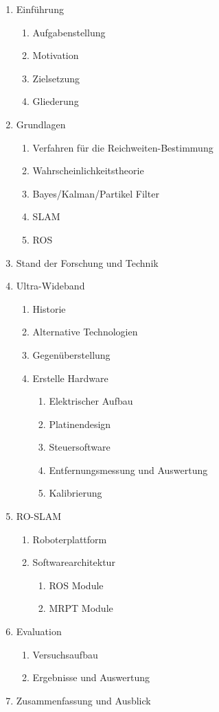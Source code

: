 \documentclass[12pt]{article}
\begin{document}
\begin{enumerate}
	\item Einführung
	\begin{enumerate}
		\item Aufgabenstellung			%
		\item Motivation					%
		\item Zielsetzung					%
		\item Gliederung					%
	\end{enumerate}
	\item Grundlagen						%
	\begin{enumerate}
		\item Verfahren für die Reichweiten-Bestimmung
		\item Wahrscheinlichkeitstheorie
		\item Bayes/Kalman/Partikel Filter
		\item SLAM
		\item ROS								%
	\end{enumerate}
	\item Stand der Forschung und Technik
	\item Ultra-Wideband
	\begin{enumerate}
		\item Historie
		\item Alternative Technologien
		\item Gegenüberstellung
		\item Erstelle Hardware
		\begin{enumerate}
			\item Elektrischer Aufbau
			\item Platinendesign
			\item Steuersoftware
			\item Entfernungsmessung und Auswertung		%
			\item Kalibrierung
		\end{enumerate}
	\end{enumerate}
	\item RO-SLAM
	\begin{enumerate}
		\item Roboterplattform				%
		\item Softwarearchitektur		%
		\begin{enumerate}	
			\item ROS Module
			\item MRPT Module
		\end{enumerate}
	\end{enumerate}
	\item Evaluation
	\begin{enumerate}
		\item Versuchsaufbau				%
		\item Ergebnisse und Auswertung
	\end{enumerate}
\item Zusammenfassung und Ausblick
\end{enumerate}
\end{document}
